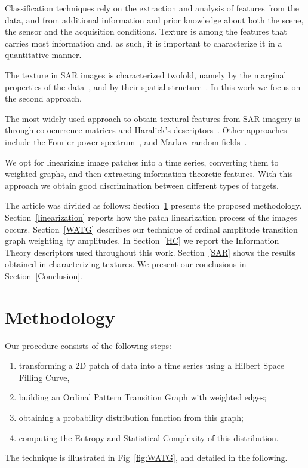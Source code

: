 \documentclass{isprs}
\begin{document}
Classification techniques rely on the extraction and analysis of features from the data, and from additional information and prior knowledge about both the scene, the sensor and the acquisition conditions.
Texture is among the features that carries most information and, as such, it is important to characterize it in a quantitative manner.

The texture in SAR images is characterized twofold, namely by the marginal properties of the data~\citep{adrian96}, and by their spatial structure~\citep{FeaturesCropDiscrimination}.
In this work we focus on the second approach.

The most widely used approach to obtain textural features from SAR imagery is through co-ocurrence matrices and Haralick's descriptors~\citep{Zakeri2017Texture}.
Other approaches include the Fourier power spectrum~\citep{Florindo2012Fractal}, and
Markov random fields~\citep{Deng2005UnsupervisedSO}.

We opt for linearizing image patches into a time series, converting them to weighted graphs, and then extracting information-theoretic features.
With this approach we obtain good discrimination between different types of targets.

The article was divided as follows:
Section~\ref{methodology} presents the proposed methodology.
Section~\ref{linearization} reports how the patch linearization process of the images occurs.
Section~\ref{WATG} describes our technique of ordinal amplitude transition graph weighting by amplitudes.
In Section~\ref{HC} we report the Information Theory descriptors used throughout this work.
Section~\ref{SAR} shows the results obtained in characterizing textures.
We present our conclusions in Section~\ref{Conclusion}.

\section{Methodology}\label{methodology}

Our procedure consists of the following steps:
\begin{enumerate}
	\item\label{item:Linearlize} transforming a 2D patch of data into a time series using a Hilbert Space Filling Curve,
	\item\label{item:WOPTG} building an Ordinal Pattern Transition Graph with weighted edges;
	\item\label{item:Probability} obtaining a probability distribution function from this graph;
	\item\label{item:Descriptors} computing the Entropy and Statistical Complexity of this distribution.
\end{enumerate}
The technique is illustrated in Fig~\ref{fig:WATG}, and detailed in the following.
\end{document}

